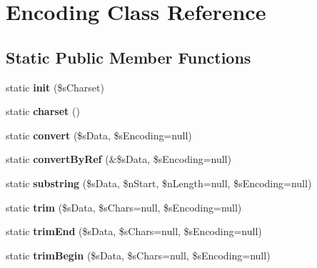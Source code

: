 \hypertarget{class_encoding}{\section{Encoding Class Reference}
\label{class_encoding}
}
\subsection*{Static Public Member Functions}
\begin{DoxyCompactItemize}
\item 
\hypertarget{class_encoding_a0b6a59239a47c7f1618d41e97145c7a7}{static {\bfseries init} (\$s\-Charset)}\label{class_encoding_a0b6a59239a47c7f1618d41e97145c7a7}

\item 
\hypertarget{class_encoding_a133c64ed03781d7531532fea284148eb}{static {\bfseries charset} ()}\label{class_encoding_a133c64ed03781d7531532fea284148eb}

\item 
\hypertarget{class_encoding_aa70792068324b16229967c8fb0ec4304}{static {\bfseries convert} (\$s\-Data, \$s\-Encoding=null)}\label{class_encoding_aa70792068324b16229967c8fb0ec4304}

\item 
\hypertarget{class_encoding_ad437ae7bfc2e777fd14cc589320ccacc}{static {\bfseries convert\-By\-Ref} (\&\$s\-Data, \$s\-Encoding=null)}\label{class_encoding_ad437ae7bfc2e777fd14cc589320ccacc}

\item 
\hypertarget{class_encoding_acd8fc4ebc4aedf62e5943eed962dafd5}{static {\bfseries substring} (\$s\-Data, \$n\-Start, \$n\-Length=null, \$s\-Encoding=null)}\label{class_encoding_acd8fc4ebc4aedf62e5943eed962dafd5}

\item 
\hypertarget{class_encoding_a0443e7e855cac9849d7eef36de3cc048}{static {\bfseries trim} (\$s\-Data, \$s\-Chars=null, \$s\-Encoding=null)}\label{class_encoding_a0443e7e855cac9849d7eef36de3cc048}

\item 
\hypertarget{class_encoding_a96ddc0cebf9af7a7f419420711132732}{static {\bfseries trim\-End} (\$s\-Data, \$s\-Chars=null, \$s\-Encoding=null)}\label{class_encoding_a96ddc0cebf9af7a7f419420711132732}

\item 
\hypertarget{class_encoding_ab035f79f330c16106b4b7c5be32a4a1b}{static {\bfseries trim\-Begin} (\$s\-Data, \$s\-Chars=null, \$s\-Encoding=null)}\label{class_encoding_ab035f79f330c16106b4b7c5be32a4a1b}


\end{DoxyCompactItemize}
